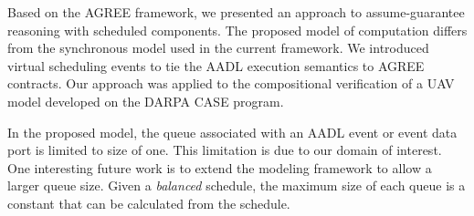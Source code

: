 Based on the AGREE framework, we presented an approach to assume-guarantee reasoning with scheduled components. The proposed model of computation differs from the synchronous model used in the current framework. We introduced virtual scheduling events to tie the AADL execution semantics to AGREE contracts. Our approach was applied to the compositional verification of a UAV model developed on the DARPA CASE program.

In the proposed model, the queue associated with an AADL event or event data port is limited to size of one. This limitation is due to our domain of interest. One interesting future work is to extend the modeling framework to allow a larger queue size. Given a \emph{balanced} schedule, the maximum size of each queue is a constant that can be calculated from the schedule.